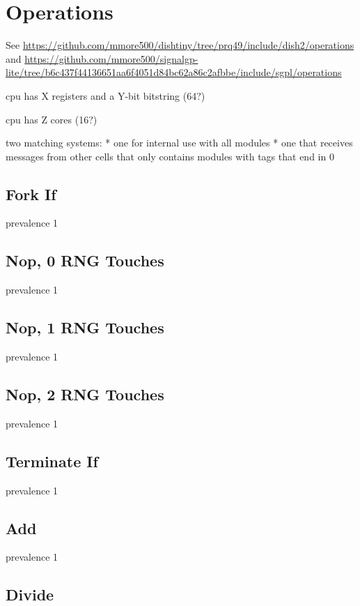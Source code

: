 \section{Operations}

See \url{https://github.com/mmore500/dishtiny/tree/prq49/include/dish2/operations} and \url{https://github.com/mmore500/signalgp-lite/tree/b6c437f44136651aa6f4051d84bc62a86c2afbbe/include/sgpl/operations}

cpu has X registers and a Y-bit bitstring (64?)

cpu has Z cores (16?)

two matching systems: 
* one for internal use with all modules
* one that receives messages from other cells that only contains modules with tags that end in 0

\subsection{Fork If}

prevalence 1

\subsection{Nop, 0 RNG Touches}

prevalence 1

\subsection{Nop, 1 RNG Touches}

prevalence 1

\subsection{Nop, 2 RNG Touches}

prevalence 1

\subsection{Terminate If}

prevalence 1

\subsection{Add}

prevalence 1

\subsection{Divide}

